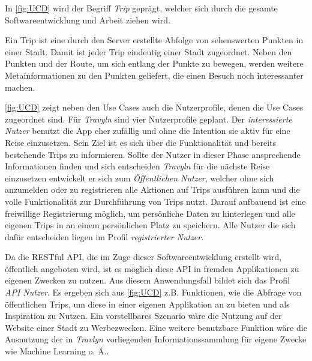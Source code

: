 \newpage

In \autoref{fig:UCD} wird der Begriff \textit{Trip} geprägt, welcher sich durch die gesamte Softwareentwicklung und Arbeit ziehen wird.

\begin{defStrich}[Trip]
	Ein Trip ist eine durch den Server erstellte Abfolge von sehenswerten Punkten in einer Stadt. Damit ist jeder Trip eindeutig einer Stadt zugeordnet. Neben den Punkten und der Route, um sich entlang der Punkte zu bewegen, werden weitere Metainformationen zu den Punkten geliefert, die einen Besuch noch interessanter machen.
\end{defStrich} 

\vspace{0.25cm}

\autoref{fig:UCD} zeigt neben den Use Cases auch die Nutzerprofile, denen die Use Cases zugeordnet sind. Für \textit{Travyln} sind vier Nutzerprofile geplant. Der \textit{interessierte Nutzer} benutzt die App eher zufällig und ohne die Intention sie aktiv für eine Reise einzusetzen. Sein Ziel ist es sich über die Funktionalität und bereits bestehende Trips zu informieren. Sollte der Nutzer in dieser Phase ansprechende Informationen finden und sich entscheiden \textit{Travyln} für die nächste Reise einzusetzen entwickelt er sich zum \textit{Öffentlichen Nutzer}, welcher ohne sich anzumelden oder zu registrieren alle Aktionen auf Trips ausführen kann und die volle Funktionalität zur Durchführung von Trips nutzt. Darauf aufbauend ist eine freiwillige Registrierung möglich, um persönliche Daten zu hinterlegen und alle eigenen Trips in an einem persönlichen Platz zu speichern. Alle Nutzer die sich dafür entscheiden liegen im Profil \textit{registrierter Nutzer}.

\vspace{0.25cm}

Da die RESTful API, die im Zuge dieser Softwareentwicklung erstellt wird, öffentlich angeboten wird, ist es möglich diese API in fremden Applikationen zu eigenen Zwecken zu nutzen. Aus diesem Anwendungsfall bildet sich das Profil \textit{API Nutzer}. Es ergeben sich aus \autoref{fig:UCD} z.B. Funktionen, wie die Abfrage von öffentlichen Trips, um diese in einer eigenen Applikation an zu bieten und als Inspiration zu Nutzen. Ein vorstellbares Szenario wäre die Nutzung auf der Website einer Stadt zu Werbezwecken. Eine weitere benutzbare Funktion wäre die Ausnutzung der in \textit{Travlyn} vorliegenden Informationssammlung für eigene Zwecke wie Machine Learning o. Ä.. 

